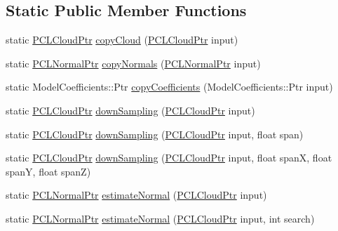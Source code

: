 \subsection*{Static Public Member Functions}
\begin{DoxyCompactItemize}
\item 
static \hyperlink{pc__primitive_8h_aa14a240c8d999c4f56133c0f70e88783}{P\-C\-L\-Cloud\-Ptr} \hyperlink{classpcm_1_1PCManager_afd0b3ae22849345d490ba27b425254a1}{copy\-Cloud} (\hyperlink{pc__primitive_8h_aa14a240c8d999c4f56133c0f70e88783}{P\-C\-L\-Cloud\-Ptr} input)
\item 
static \hyperlink{pc__primitive_8h_a1bc38ce8b0c26e5f2d28fae9f3e3ea97}{P\-C\-L\-Normal\-Ptr} \hyperlink{classpcm_1_1PCManager_aa580e879cf08a919167bcec0b213eb28}{copy\-Normals} (\hyperlink{pc__primitive_8h_a1bc38ce8b0c26e5f2d28fae9f3e3ea97}{P\-C\-L\-Normal\-Ptr} input)
\item 
static Model\-Coefficients\-::\-Ptr \hyperlink{classpcm_1_1PCManager_aa3397d6597a17ee15d2c539631e008c2}{copy\-Coefficients} (Model\-Coefficients\-::\-Ptr input)
\item 
static \hyperlink{pc__primitive_8h_aa14a240c8d999c4f56133c0f70e88783}{P\-C\-L\-Cloud\-Ptr} \hyperlink{classpcm_1_1PCManager_ab9c66b0834ca1ef0c1c01e21400103dd}{down\-Sampling} (\hyperlink{pc__primitive_8h_aa14a240c8d999c4f56133c0f70e88783}{P\-C\-L\-Cloud\-Ptr} input)
\item 
static \hyperlink{pc__primitive_8h_aa14a240c8d999c4f56133c0f70e88783}{P\-C\-L\-Cloud\-Ptr} \hyperlink{classpcm_1_1PCManager_a32a6c0ad1f2d23e48ddb4302be7d14c5}{down\-Sampling} (\hyperlink{pc__primitive_8h_aa14a240c8d999c4f56133c0f70e88783}{P\-C\-L\-Cloud\-Ptr} input, float span)
\item 
static \hyperlink{pc__primitive_8h_aa14a240c8d999c4f56133c0f70e88783}{P\-C\-L\-Cloud\-Ptr} \hyperlink{classpcm_1_1PCManager_a30723a3f4808cd2a161b58c0888d5dfa}{down\-Sampling} (\hyperlink{pc__primitive_8h_aa14a240c8d999c4f56133c0f70e88783}{P\-C\-L\-Cloud\-Ptr} input, float span\-X, float span\-Y, float span\-Z)
\item 
static \hyperlink{pc__primitive_8h_a1bc38ce8b0c26e5f2d28fae9f3e3ea97}{P\-C\-L\-Normal\-Ptr} \hyperlink{classpcm_1_1PCManager_ab2cdef39cbe4f3d6c3660d873bd9a38e}{estimate\-Normal} (\hyperlink{pc__primitive_8h_aa14a240c8d999c4f56133c0f70e88783}{P\-C\-L\-Cloud\-Ptr} input)
\item 
static \hyperlink{pc__primitive_8h_a1bc38ce8b0c26e5f2d28fae9f3e3ea97}{P\-C\-L\-Normal\-Ptr} \hyperlink{classpcm_1_1PCManager_a7cad87bdc0a16f5b4b6108259ace90d3}{estimate\-Normal} (\hyperlink{pc__primitive_8h_aa14a240c8d999c4f56133c0f70e88783}{P\-C\-L\-Cloud\-Ptr} input, int search)

\end{DoxyCompactItemize}

